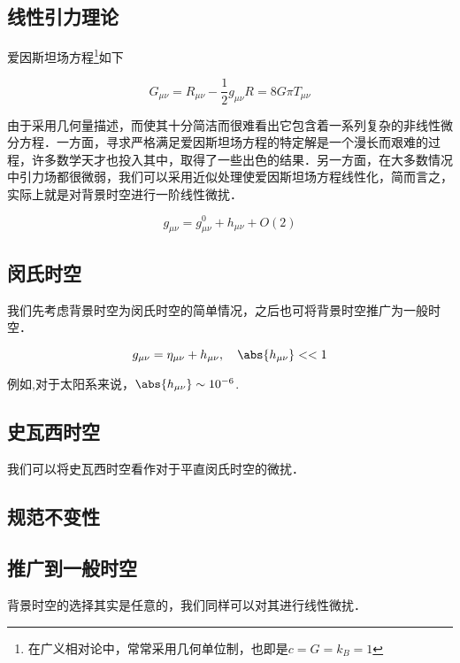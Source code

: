 
\begin{issues}
\issueMissDepend
\issueDraft
\end{issues}



\subsection{线性引力理论}
爱因斯坦场方程\footnote{在广义相对论中，常常采用几何单位制，也即是$c=G=k_B=1$}如下

\begin{equation}
G_{\mu \nu} = R_{\mu \nu} - \frac{1}{2}g_{\mu\nu}R = 8 G\pi T_{\mu\nu}
\end{equation}

由于采用几何量描述，而使其十分简洁而很难看出它包含着一系列复杂的非线性微分方程．一方面，寻求严格满足爱因斯坦场方程的特定解是一个漫长而艰难的过程，许多数学天才也投入其中，取得了一些出色的结果．另一方面，在大多数情况中引力场都很微弱，我们可以采用近似处理使爱因斯坦场方程线性化，简而言之，实际上就是对背景时空进行一阶线性微扰．

\begin{equation}
g_{\mu\nu}=g^0_{\mu\nu}+h_{\mu\nu} + O(2)
\end{equation}


\subsection{闵氏时空}

我们先考虑背景时空为闵氏时空的简单情况，之后也可将背景时空推广为一般时空．

\begin{equation}
g_{\mu\nu} = \eta_{\mu\nu} + h_{\mu\nu},\quad \abs{h_{\mu\nu}}<<1
\end{equation}

例如,对于太阳系来说，$\abs{h_{\mu\nu}} \sim 10^{-6}$.


\subsection{史瓦西时空}

我们可以将史瓦西时空看作对于平直闵氏时空的微扰．


\subsection{规范不变性}


\subsection{推广到一般时空}

背景时空的选择其实是任意的，我们同样可以对其进行线性微扰．

